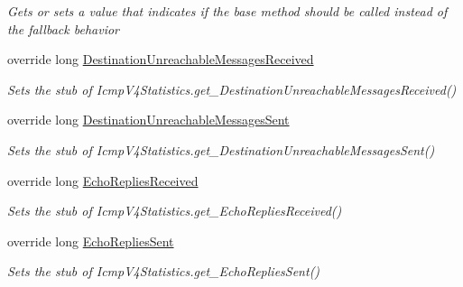 \begin{DoxyCompactItemize}
\begin{DoxyCompactList}\small\item\em Gets or sets a value that indicates if the base method should be called instead of the fallback behavior\end{DoxyCompactList}\item 
override long \hyperlink{class_system_1_1_net_1_1_network_information_1_1_fakes_1_1_stub_icmp_v4_statistics_a844f1676ba23894057f258dbd1211c58}{Destination\-Unreachable\-Messages\-Received}
\begin{DoxyCompactList}\small\item\em Sets the stub of Icmp\-V4\-Statistics.\-get\-\_\-\-Destination\-Unreachable\-Messages\-Received()\end{DoxyCompactList}\item 
override long \hyperlink{class_system_1_1_net_1_1_network_information_1_1_fakes_1_1_stub_icmp_v4_statistics_a5d3bc59f411b13b6474bd84854653d8d}{Destination\-Unreachable\-Messages\-Sent}
\begin{DoxyCompactList}\small\item\em Sets the stub of Icmp\-V4\-Statistics.\-get\-\_\-\-Destination\-Unreachable\-Messages\-Sent()\end{DoxyCompactList}\item 
override long \hyperlink{class_system_1_1_net_1_1_network_information_1_1_fakes_1_1_stub_icmp_v4_statistics_a86fe3036218a2e084a32559f2573fcb0}{Echo\-Replies\-Received}
\begin{DoxyCompactList}\small\item\em Sets the stub of Icmp\-V4\-Statistics.\-get\-\_\-\-Echo\-Replies\-Received()\end{DoxyCompactList}\item 
override long \hyperlink{class_system_1_1_net_1_1_network_information_1_1_fakes_1_1_stub_icmp_v4_statistics_a5992b63600c9b2b306f50c81f2db17cd}{Echo\-Replies\-Sent}
\begin{DoxyCompactList}\small\item\em Sets the stub of Icmp\-V4\-Statistics.\-get\-\_\-\-Echo\-Replies\-Sent()\end{DoxyCompactList}\item 

\end{DoxyCompactItemize}
